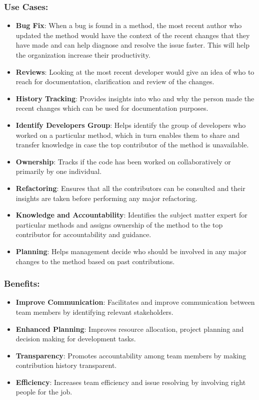 \subsubsection{Use Cases:}
\begin{itemize}[label=$\bullet$]
	\item \textbf{Bug Fix}: When a bug is found in a method, the most recent author who updated the method would have the context of the recent changes that they have made and can help diagnose and resolve the issue faster. This will help the organization increase their productivity.
	\item \textbf{Reviews}: Looking at the most recent developer would give an idea of who to reach for documentation, clarification and review of the changes.
	\item \textbf{History Tracking}: Provides insights into who and why the person made the recent changes which can be used for documentation purposes.
	\item \textbf{Identify Developers Group}: Helps identify the group of developers who worked on a particular method, which in turn enables them to share and transfer knowledge in case the top contributor of the method is unavailable.
	\item \textbf{Ownership}: Tracks if the code has been worked on collaboratively or primarily by one individual.
	\item \textbf{Refactoring}: Ensures that all the contributors can be consulted and their insights are taken before performing any major refactoring.
	\item \textbf{Knowledge and Accountability}: Identifies the subject matter expert for particular methods and assigns ownership of the method to the top contributor for accountability and guidance.
	\item \textbf{Planning}: Helps management decide who should be involved in any major changes to the method based on past contributions.
\end{itemize}
\subsubsection{Benefits:}
\begin{itemize}[label=$\bullet$]
	\item \textbf{Improve Communication}: Facilitates and improve communication between team members by identifying relevant stakeholders.
	\item \textbf{Enhanced Planning}: Improves resource allocation, project planning and decision making for development tasks.
	\item \textbf{Transparency}: Promotes accountability among team members by making contribution history transparent.
	\item \textbf{Efficiency}: Increases team efficiency and issue resolving by involving right people for the job.
\end{itemize}

